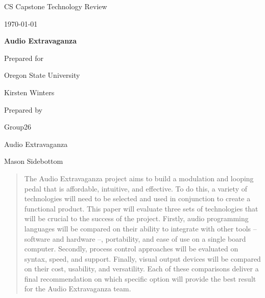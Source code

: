 \documentclass[onecolumn, draftclsnofoot,10pt, compsoc]{IEEEtran}
\def \CapstoneTeamName{Audio Extravaganza}
\def \CapstoneTeamNumber{26}
\def \GroupMemberOne{Martin Barker}
\def \GroupMemberTwo{Devon Cash}
\def \GroupMemberThree{Alexander Niebur}
\def \GroupMemberFour{Mason Sidebottom}
\def \GroupMemberFive{Ben Windheim}
\def \CapstoneProjectName{Audio Extravaganza}
\def \CapstoneSponsorCompany{Oregon State University}
\def \CapstoneSponsorPerson{Kirsten Winters}
\def \DocType{		
				Technology Review
				}
\newcommand{\NameSigPair}[1]{\par
\makebox[2.75in][r]{#1} \hfil 	\makebox[3.25in]{\makebox[2.25in]{\hrulefill} \hfill		\makebox[.75in]{\hrulefill}}
\par\vspace{-12pt} \textit{\tiny\noindent
\makebox[2.75in]{} \hfil		\makebox[3.25in]{\makebox[2.25in][r]{Signature} \hfill	\makebox[.75in][r]{Date}}}}
\renewcommand{\NameSigPair}[1]{#1}
\begin{document}
\begin{titlepage}
    \begin{singlespace}
        \hfill  
        \par\vspace{.2in}
        \centering
        \scshape{
            \huge CS Capstone \DocType \par
            {\large\today}\par
            \vspace{.5in}
            \textbf{\Huge\CapstoneProjectName}\par
            \vfill
            {\large Prepared for}\par
            \Huge \CapstoneSponsorCompany\par
            \vspace{5pt}
            {\Large\NameSigPair{\CapstoneSponsorPerson}\par}
            {\large Prepared by }\par
            Group\CapstoneTeamNumber\par
            \CapstoneTeamName\par 
            \vspace{5pt}
            {\Large
                \NameSigPair{\GroupMemberFour}\par
            }
            \vspace{20pt}
        }
        \begin{abstract}
        The Audio Extravaganza project aims to build a modulation and looping pedal that is affordable, intuitive, and effective.
        To do this, a variety of technologies will need to be selected and used in conjunction to create a functional product.
        This paper will evaluate three sets of technologies that will be crucial to the success of the project.
        Firstly, audio programming languages will be compared on their ability to integrate with other tools -- software and hardware --, portability, and ease of use on a single board computer.
        Secondly, process control approaches will be evaluated on syntax, speed, and support. 
        Finally, visual output devices will be compared on their cost, usability, and versatility.
        Each of these comparisons deliver a final recommendation on which specific option will provide the best result for the Audio Extravaganza team.
		
		\end{abstract}     
    \end{singlespace}
\end{titlepage}
\end{document}
